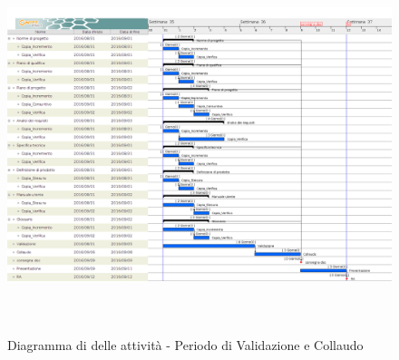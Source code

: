 		\begin{figure}[!h]
			\centering
			\includegraphics[height=11cm, width=15cm]{img/gantt/V} 
			\caption{Diagramma di  delle attività - Periodo di Validazione e Collaudo}
		\end{figure}
